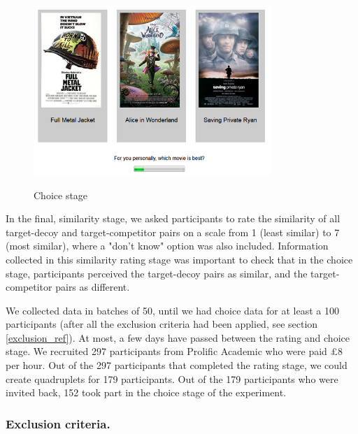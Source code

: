 \documentclass[12pt, a4paper]{article}
\begin{document}
\begin{figure}[htb!]
\centering
\captionsetup{justification=centering}
\caption{Choice stage}
\includegraphics[width=0.8\textwidth]{rsz_exp1_choicestage.png}
\label{fig:exp1_screenshot}
\end{figure}

In the final, similarity stage, we asked participants to rate the similarity of all target-decoy and target-competitor pairs on a scale from 1 (least similar) to 7 (most similar), where a "don't know" option was also included. Information collected in this similarity rating stage was important to check that in the choice stage, participants perceived the target-decoy pairs as similar, and the target-competitor pairs as different.

We collected data in batches of 50, until we had choice data for at least a 100 participants (after all the exclusion criteria had been applied, see section \ref{exclusion_ref}). At most, a few days have passed between the rating and choice stage. We recruited 297 participants from Prolific Academic who were paid £8 per hour. Out of the 297 participants that completed the rating stage, we could create quadruplets for 179 participants. Out of the 179 participants who were invited back, 152 took part in the choice stage of the experiment.

\subsubsection*{Exclusion criteria.} \label{exclusion_ref}
\end{document}
